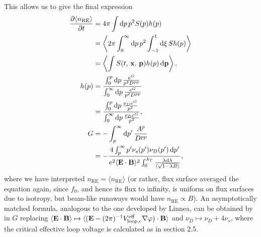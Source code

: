 \documentclass[11pt,a4paper]{article}
\newcommand{\rd}{\ensuremath{\mathrm{d}}}
\newcommand{\sub}[1]{\ensuremath{_{\text{#1}}}}
\renewcommand{\b}[1]{\ensuremath{ {\bf #1 } }}
\begin{document}
This allows us to give the final expression
\begin{align}
\frac{\partial \langle n\sub{RE}\rangle}{\partial t} &= 4\pi \int \rd p \,p^2S(p)h(p) \nonumber \\
&= \left\langle 2\pi\int_0^\infty \rd p \,p^2\int_{-1}^1 \rd \xi \,S h(p) \right\rangle \nonumber \\
&= \left\langle  \int S(t,\,\b{x},\,\b{p}) h(p) \, \rd\b{p}\right\rangle,  \nonumber \\
h(p) &=  \frac{ \int_0^p \rd p \,\frac{e^G}{p^2 D^{pp}}}{ \int_0^\infty \rd p \,\frac{e^G}{p^2 D^{pp}}} \nonumber \\
&= \frac{ \int_0^p \rd p \,\frac{\nu_D e^G}{p^2}}{ \int_0^\infty \rd p \,\frac{\nu_D e^G}{p^2}}, \nonumber \\
G &= -\int_p^\infty \rd p' \,\frac{A^p}{D^{pp}} \nonumber \\
&= - \frac{4 \int_p^\infty p'\nu_s(p')\nu_D(p') \,\rd p'}{e^2 \langle \b{E}\cdot\b{B}\rangle^2 \int_0^{\lambda_T} \frac{\lambda\rd\lambda}{\langle\sqrt{1-\lambda B}\rangle}},
\end{align}
where we have interpreted $n\sub{RE} = \langle n\sub{RE}\rangle$ (or rather, flux surface averaged the equation again, since $f_0$, and hence its flux to infinity, is uniform on flux surfaces due to isotropy, but beam-like runaways would have $n\sub{RE}\propto B$). An asymptotically matched formula, analogous to the one developed by Linnea, can be obtained by in $G$ replacing $\langle \b{E}\cdot\b{B}\rangle \mapsto \langle (\b{E}-(2\pi)^{-1}V\sub{loop,c}^\text{eff}\nabla\varphi)\cdot\b{B}\rangle$ and $\nu_D\mapsto \nu_D+4\nu_s$, where the critical effective loop voltage is calculated as in section 2.5.
\end{document}
